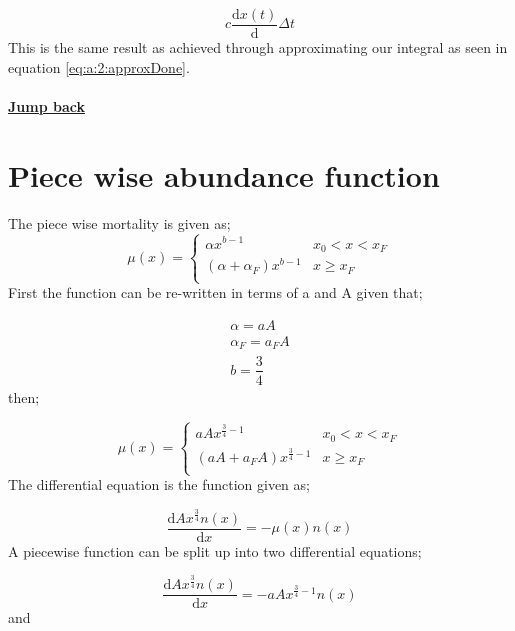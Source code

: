 \documentclass{article}
\numberwithin{equation}{section} %
\newcommand{\md}{\mathrm{d}}
\begin{document}
\begin{equation}
    c\dfrac{\md x(t)}{\md }\Delta t
\end{equation}
This is the same result as achieved through approximating our integral as seen in equation \ref{eq:a:2:approxDone}.\\
\\
\textbf{\hyperref[jmp:a:proofBiomassCohort]{Jump back }}

\newpage
\section{Piece wise abundance function}\label{a:abundancepiecewise}
The piece wise mortality is given as;
\begin{equation}\label{eq:a:pBC:1}
\mu(x) =
       \left\{
        \begin{array}{ll}
              \alpha x^{b-1} & x_0 < x < x_F \\
              (\alpha+\alpha_F)x^{b-1} &  x\geq x_F \\
        \end{array} 
\right.
\end{equation}
First the function can be re-written in terms of a and A given that;

\begin{align}
    \alpha = aA\\
    \alpha_F = a_FA\\
    b=\dfrac{3}{4}
\end{align}
then;

\begin{equation}\label{eq:a:pBC:2}
\mu(x) =
       \left\{
        \begin{array}{ll}
              aA x^{\tfrac{3}{4}-1} & x_0 < x < x_F \\
              (aA+a_FA)x^{\tfrac{3}{4}-1} &  x\geq x_F \\
        \end{array} 
\right.
\end{equation}
The differential equation is the function given as;

\begin{equation}
	\dfrac{\md Ax^{\tfrac{3}{4}}n(x)}{\md x} = -\mu(x)n(x)
\end{equation}
A piecewise function can be split up into two differential equations;

\begin{equation}\label{eq:a:pBCeq1}
	\dfrac{\md Ax^{\tfrac{3}{4}}n(x)}{\md x} = -aA x^{\tfrac{3}{4}-1}n(x)
\end{equation}
and
\end{document}
